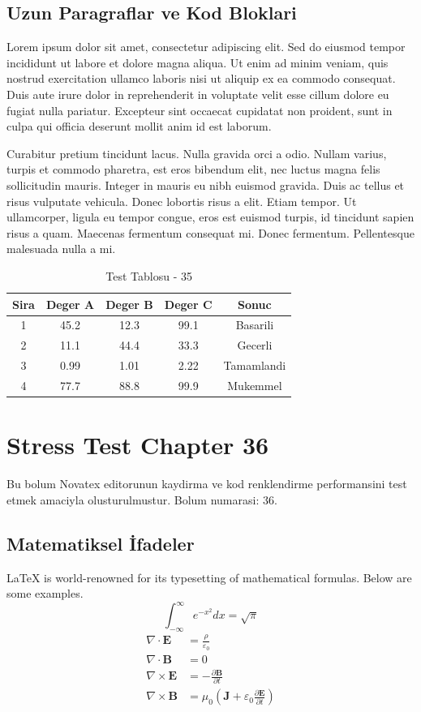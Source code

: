 \documentclass[12pt,a4paper]{article}
\begin{document}
\subsection{Uzun Paragraflar ve Kod Bloklari}
Lorem ipsum dolor sit amet, consectetur adipiscing elit. Sed do eiusmod tempor incididunt ut labore et dolore magna aliqua. Ut enim ad minim veniam, quis nostrud exercitation ullamco laboris nisi ut aliquip ex ea commodo consequat. Duis aute irure dolor in reprehenderit in voluptate velit esse cillum dolore eu fugiat nulla pariatur. Excepteur sint occaecat cupidatat non proident, sunt in culpa qui officia deserunt mollit anim id est laborum.

Curabitur pretium tincidunt lacus. Nulla gravida orci a odio. Nullam varius, turpis et commodo pharetra, est eros bibendum elit, nec luctus magna felis sollicitudin mauris. Integer in mauris eu nibh euismod gravida. Duis ac tellus et risus vulputate vehicula. Donec lobortis risus a elit. Etiam tempor. Ut ullamcorper, ligula eu tempor congue, eros est euismod turpis, id tincidunt sapien risus a quam. Maecenas fermentum consequat mi. Donec fermentum. Pellentesque malesuada nulla a mi.

\begin{table}[h!]
\centering
\begin{tabular}{|c|c|c|c|c|}
\hline
\textbf{Sira} & \textbf{Deger A} & \textbf{Deger B} & \textbf{Deger C} & \textbf{Sonuc} \\
\hline
1 & 45.2 & 12.3 & 99.1 & Basarili \\
2 & 11.1 & 44.4 & 33.3 & Gecerli \\
3 & 0.99 & 1.01 & 2.22 & Tamamlandi \\
4 & 77.7 & 88.8 & 99.9 & Mukemmel \\
\hline
\end{tabular}
\caption{Test Tablosu - 35}
\end{table}

\newpage
\section{Stress Test Chapter 36}
Bu bolum Novatex editorunun kaydirma ve kod renklendirme performansini test etmek amaciyla olusturulmustur. Bolum numarasi: 36.

\subsection{Matematiksel İfadeler}
\LaTeX{} is world-renowned for its typesetting of mathematical formulas. Below are some examples.
\begin{equation}
\int_{-\infty}^{\infty} e^{-x^2} dx = \sqrt{\pi}
\end{equation}
\begin{align}
\nabla \cdot \mathbf{E} &= \frac{\rho}{\varepsilon_0} \\
\nabla \cdot \mathbf{B} &= 0 \\
\nabla \times \mathbf{E} &= -\frac{\partial \mathbf{B}}{\partial t} \\
\nabla \times \mathbf{B} &= \mu_0\left(\mathbf{J} + \varepsilon_0 \frac{\partial \mathbf{E}}{\partial t}\right)
\end{align}
\end{document}

